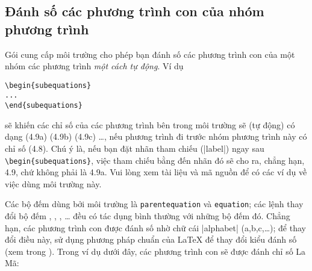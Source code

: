 \subsection{Đánh số các phương trình con của nhóm phương trình}

Gói  cung cấp môi trường  cho phép
bạn đánh số các phương trình con của một nhóm các phương trình
\emph{một cách tự động}. Ví dụ

\medskip
\begin{verbatim}
\begin{subequations}
...
\end{subequations}
\end{verbatim}

\medskip
\noindent
sẽ khiến các chỉ số của các phương trình bên trong môi trường
 sẽ (tự động) có dạng (4.9a) (4.9b) (4.9c) \dots,
nếu phương trình đi trước nhóm phương trình này có chỉ số (4.8).
Chú ý là, nếu bạn đặt nhãn tham chiếu (|label|) ngay sau
\verb/\begin{subequations}/, việc tham chiếu bằng 
đến nhãn đó sẽ cho ra, chẳng hạn, 4.9, chứ không phải là 4.9a.
Vui lòng xem tài liệu  và mã nguồn 
để có các ví dụ về việc dùng môi trường này.

\medskip
Các bộ đếm dùng bởi môi trường  là \verb/parentequation/
và \verb/equation/; các lệnh thay đổi bộ đếm
, , , \ldots
đều có tác dụng bình thường với những bộ đếm đó.
Chẳng hạn, các phương trình con được đánh số nhờ chữ cái |alphabet|
(a,b,c,\ldots); để thay đổi điều này, sử dụng phương pháp chuẩn
của \LaTeX{} để thay đổi kiểu đánh số (xem trong \cite[\S6.3, \S C.8.4]{lamport}).
Trong ví dụ dưới đây, các phương trình con sẽ được đánh chỉ số La Mã:

